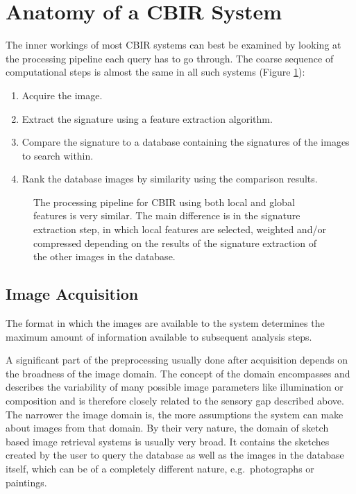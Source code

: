 \section{Anatomy of a CBIR System}\label{sec:anatomy}

The inner workings of most CBIR systems can best be examined by looking at the
processing pipeline each query has to go through. The coarse sequence of
computational steps is almost the same in all such systems (Figure
\ref{fig:cbir_coarse_structure}):

\begin{enumerate}
    \item Acquire the image.
    \item Extract the signature using a feature extraction algorithm.
    \item Compare the signature to a database containing the signatures of the
        images to search within.
    \item Rank the database images by similarity using the comparison results.
\end{enumerate}

\begin{figure}[h]
    \centering
    \quad
    \caption[Coarse structure of a CBIR system]{
        The processing pipeline for CBIR using both local and global features
        is very similar. The main difference is in the signature extraction
        step, in which local features are selected, weighted and/or compressed
        depending on the results of the signature extraction of the other
        images in the database.
    }
    \label{fig:cbir_coarse_structure}
\end{figure}

\subsection{Image Acquisition}\label{sec:anatomy_image_acquisition}

The format in which the images are available to the system determines the
maximum amount of information available to subsequent analysis steps.

A significant part of the preprocessing usually done after acquisition depends
on the broadness of the image domain. The concept of the domain encompasses and
describes the variability of many possible image parameters like illumination
or composition and is therefore closely related to the sensory gap described
above. The narrower the image domain is, the more assumptions the system can
make about images from that domain. By their very nature, the domain of sketch
based image retrieval systems is usually very broad. It contains the sketches
created by the user to query the database as well as the images in the database
itself, which can be of a completely different nature, e.g.\ photographs or
paintings.

